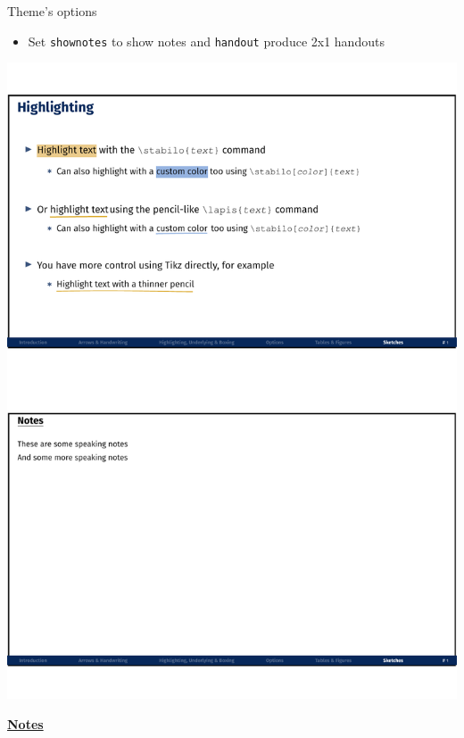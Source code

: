\documentclass[10pt]{beamer}
\begin{document}
\begin{frame}
    {Theme's options}
    \begin{itemize}
        \item Set \texttt{shownotes} to show notes and \texttt{handout} produce 2x1 handouts
    \end{itemize}
    \begin{center}
        \begin{minipage}[b]{.3\textwidth}
            \includegraphics[width=\textwidth]{shownotes_handout}
        \end{minipage}
    \end{center}
\end{frame}
\begin{flushleft}
    \underline{\textbf{Notes}}\setlength{\parskip}{.15cm}\notesize\newline\par
\end{flushleft}
\end{document}
